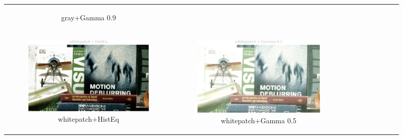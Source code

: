 \documentclass[11pt, a4]{article}
\begin{document}
\begin{enumerate}
\begin{enumerate}
\begin{figure}[h]
{\begin{tabular}{cccc}
\begin{subfigure}[h]{0.45\linewidth}
							\caption{gray+Gamma 0.9}
							\label{fig:RawImage1_tone_4}
						\end{subfigure}\\
						\begin{subfigure}[h]{0.45\linewidth}
							\centering
							\includegraphics[width=\linewidth]{../output/RawImage1_Tone_whitepatch_HistEq.pdf}
							\caption{whitepatch+HistEq}
							\label{fig:RawImage1_tone_5}
						\end{subfigure} &
						\begin{subfigure}[h]{0.45\linewidth}
							\centering
							\includegraphics[width=\linewidth]{../output/RawImage1_Tone_whitepatch_Gamma0.5.pdf}
							\caption{whitepatch+Gamma 0.5}
							\label{fig:RawImage1_tone_6}
						\end{subfigure} &
						\begin{subfigure}[h]{0.45\linewidth}
							\centering

\end{subfigure}
\end{tabular}}
\end{figure}
\end{enumerate}
\end{enumerate}
\end{document}
